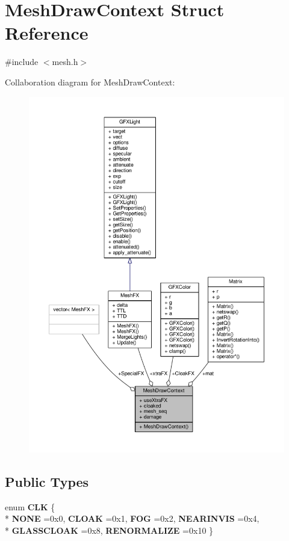 \hypertarget{structMeshDrawContext}{}\section{Mesh\+Draw\+Context Struct Reference}
\label{structMeshDrawContext}


{\ttfamily \#include $<$mesh.\+h$>$}



Collaboration diagram for Mesh\+Draw\+Context\+:
\nopagebreak
\begin{figure}[H]
\begin{center}
\leavevmode
\includegraphics[width=350pt]{d1/d79/structMeshDrawContext__coll__graph}
\end{center}
\end{figure}
\subsection*{Public Types}
\begin{DoxyCompactItemize}
\item 
enum {\bfseries C\+LK} \{ \\*
{\bfseries N\+O\+NE} =0x0, 
{\bfseries C\+L\+O\+AK} =0x1, 
{\bfseries F\+OG} =0x2, 
{\bfseries N\+E\+A\+R\+I\+N\+V\+IS} =0x4, 
\\*
{\bfseries G\+L\+A\+S\+S\+C\+L\+O\+AK} =0x8, 
{\bfseries R\+E\+N\+O\+R\+M\+A\+L\+I\+ZE} =0x10
 \}\hypertarget{structMeshDrawContext_a1fe8f2f1fae247c69a1543cdb23763e6}{}\label{structMeshDrawContext_a1fe8f2f1fae247c69a1543cdb23763e6}

\end{DoxyCompactItemize}
